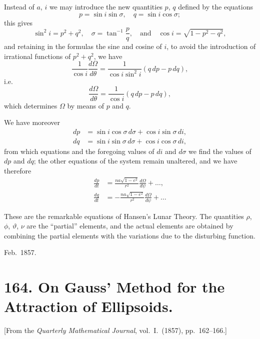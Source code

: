 \documentclass[12pt,a4paper]{article}
\theoremstyle{plain}
\begin{document}
Instead of $a$, $i$ we may introduce the new quantities $p$, $q$ defined by the equations
\[
p = \sin i\sin\sigma, \quad q = \sin i\cos\sigma;
\]
this gives
\[
\sin^2 i = p^2 + q^2, \quad \sigma = \tan^{-1}\frac{p}{q}, \quad \text{and} \quad \cos i = \sqrt{1-p^2-q^2},
\]
and retaining in the formulas the sine and cosine of $i$, to avoid the introduction of irrational functions of $p^2+q^2$, we have
\[
\frac{1}{\cos i}\frac{d\Omega}{d\theta} = \frac{1}{\cos i\sin^2 i}(q\, dp - p\, dq),
\]
i.e.
\[
\frac{d\Omega}{d\theta} = \frac{1}{\cos i}(q\, dp - p\, dq),
\]
which determines $\Omega$ by means of $p$ and $q$.

We have moreover
\begin{align*}
dp &= \sin i\cos\sigma\, d\sigma + \cos i\sin\sigma\, di, \\
dq &= \sin i\sin\sigma\, d\sigma + \cos i\cos\sigma\, di,
\end{align*}
from which equations and the foregoing values of $di$ and $d\sigma$ we find the values of $dp$ and $dq$; the other equations of the system remain unaltered, and we have therefore
\begin{align*}
\frac{dp}{dt} &= \frac{na\sqrt{1-e^2}}{r^2}\frac{d\Omega}{d\psi} + \ldots, \\
\frac{dq}{dt} &= -\frac{na\sqrt{1-e^2}}{r^2}\frac{d\Omega}{d\psi} + \ldots
\end{align*}

These are the remarkable equations of Hansen's Lunar Theory. The quantities $\rho$, $\phi$, $\vartheta$, $\nu$ are the ``partial'' elements, and the actual elements are obtained by combining the partial elements with the variations due to the disturbing function.

\begin{flushright}
Feb.~1857.
\end{flushright}

\clearpage

\section*{164. On Gauss' Method for the Attraction of Ellipsoids.}

[From the \textit{Quarterly Mathematical Journal}, vol.~I.\ (1857), pp.~162--166.]
\end{document}

